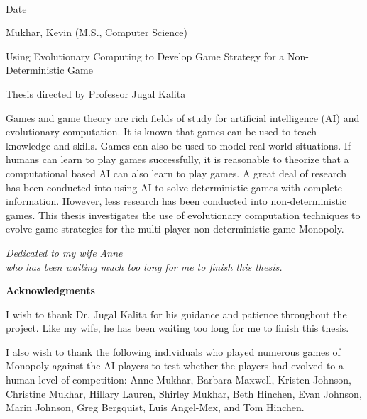 \begin{flushright}
	\vspace{2.0pc}
	\makebox[2in]{\hrulefill} \\[-1.0pc]
	Date
\end{flushright}


\newpage

\setlength{\parindent}{0in}
Mukhar, Kevin (M.S., Computer Science) 

Using Evolutionary Computing to
Develop Game Strategy for a Non-Deterministic Game 

Thesis directed by Professor Jugal Kalita

\vspace{28pt}
\setlength{\parindent}{.4in}

Games and game theory are rich fields of study for artificial intelligence (AI)
and evolutionary computation. It is known that games can be used to teach
knowledge and skills. Games can also be used to model real-world situations. If
humans can learn to play games successfully, it is reasonable to theorize that a
computational based AI can also learn to play games. A great deal of research
has been conducted into using AI to solve deterministic games with complete
information. However, less research has been conducted into non-deterministic
games. This thesis investigates the use of evolutionary computation techniques
to evolve game strategies for the multi-player non-deterministic game Monopoly.

\newpage

\parbox{5.0in}{
	\vspace{2.0in}
	\begin{center}
		{\large{\emph{Dedicated to my wife Anne\\ who has been waiting much
		too long for me to finish this thesis.}}}
	\end{center}
}


\newpage
\begin{center}
	{\large{\bf Acknowledgments}}
\end{center}
\setlength{\parindent}{.4in}

I wish to thank Dr. Jugal Kalita for his guidance and patience throughout the
project. Like my wife, he has been waiting too long for me to finish this
thesis.

I also wish to thank the following individuals who played numerous games
of Monopoly against the AI players to test whether the players had evolved to a
human level of competition: Anne Mukhar, Barbara Maxwell, Kristen Johnson,
Christine Mukhar, Hillary Lauren, Shirley Mukhar, Beth Hinchen, Evan Johnson,
Marin Johnson, Greg Bergquist, Luis Angel-Mex, and Tom Hinchen.


